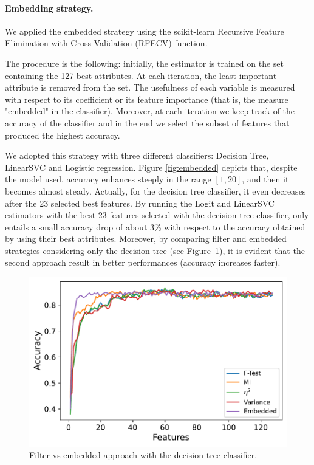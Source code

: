 \documentclass[10pt, a4paper, twocolumn]{article}
\begin{document}
\paragraph{Embedding strategy.}
We applied the embedded strategy using the scikit-learn Recursive Feature Elimination with Cross-Validation (RFECV) function.

The procedure is the following: initially, the estimator is trained on the set containing the 127 best attributes. At each iteration, the least important attribute is removed from the set. The usefulness of each variable is measured with respect to its coefficient or its feature importance (that is, the measure "embedded" in the classifier). Moreover, at each iteration we keep track of the accuracy of the classifier and in the end we select the subset of features that produced the highest accuracy. 

We adopted this strategy with three different classifiers: Decision Tree, LinearSVC and Logistic regression. Figure \ref{fig:embedded} depicts that, despite the model used, accuracy enhances steeply in the range $[1,20]$, and then it becomes almost steady. Actually, for the decision tree classifier, it even decreases after the 23 selected best features. By running the Logit and LinearSVC estimators with the best 23 features selected with the decision tree classifier, only entails a small accuracy drop of about 3\% with respect to the accuracy obtained by using their best attributes. Moreover, by comparing filter and embedded strategies considering only the decision tree (see Figure~\ref{fig:filter_vs_embedded}), it is evident that the second approach result in better performances (accuracy increases faster).

\begin{figure}
    \centering
    \includegraphics[width=0.667\linewidth]{immagini simone/output_219_0.pdf}
    \caption{Filter vs embedded approach with the decision tree classifier.}
    \label{fig:filter_vs_embedded}
\end{figure}
\end{document}
